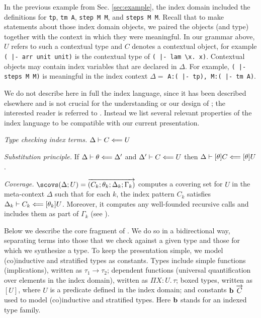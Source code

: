 In the previous example from Sec. \ref{sec:example}, the index domain
included the definitions for \lstinline!tp!, \lstinline!tm A!,
\lstinline!step M M!, and \lstinline!steps M M!. Recall that to make
statements about those index domain objects, we paired the objects
(and type) together with the context in which they were meaningful. In
our grammar above, $U$ refers to such a contextual type and $C$
denotes a contextual object, for example
\lstinline!( |- arr unit unit)! is the contextual type of
\lstinline!( |- lam \x. x)!.
Contextual objects may contain index
variables that are declared in $\Delta$. For example,
\lstinline!( |- steps M M)! is meaningful in the index context
$\Delta = $ \lstinline!A:( |- tp), M:( |- tm A)!.

We do not describe here in full the index language, since it has been
described elsewhere and is not crucial for the understanding or our
design of \Harpoon;
the interested reader is referred to \cite{Thibodeau:ICFP16,JacobRao:stratified2018}. %
Instead we list several relevant properties of the index language to be
compatible with our current presentation. %

\begin{description}
\item \emph{Type checking index terms.} $\Delta \vdash C \Longleftarrow U$
\item \emph{Substitution principle.} If $\Delta \vdash \theta \Longleftarrow \Delta'$ and $\Delta' \vdash C \Longleftarrow U$ then
  $\Delta \vdash [\theta]C \Longleftarrow [\theta]U$.
\item \emph{Coverage.}
  $\scovs (\Delta; U) = \vec{(C_k; \theta_k; \Delta_k; \Gamma_k)}$
  computes a covering set for $U$ in the meta-context $\Delta$
  such that for each $k$, the index pattern $C_k$ satisfies
  $\Delta_k \vdash C_k \Longleftarrow [\theta_k]U$.
  Moreover, it computes any well-founded recursive calls and includes them as
  part of $\Gamma_k$ (see \cite{Pientka:TLCA15}).
\end{description}


Below we describe the core fragment of \Beluga{}. We do so in a bidirectional
way, separating terms into those that we check against a given type and those
for which we synthesize a type.
To keep the presentation simple, we model
(co)inductive and stratified types as constants.
Types include simple functions (implications),
written as $\tau_1 \to \tau_2$;
dependent functions (universal quantification over elements in
the index domain), written as $\Pi X{:}U.\,\tau$;
boxed types, written as $[U]$, where $U$ is a predicate defined in the
index domain; and constants $\textbf{b}~\overrightarrow{C}$ used to model (co)inductive
and stratified types. Here $\textbf{b}$ stands for an indexed type
family.

